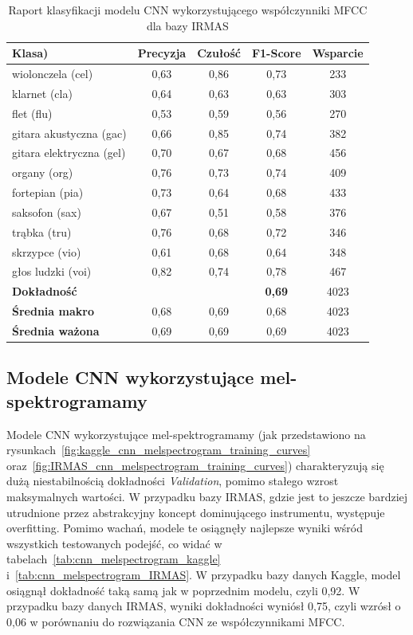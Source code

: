 \documentclass{SGGW-thesis}
\begin{document}
\begin{table}[H]
\centering
\caption{Raport klasyfikacji modelu CNN wykorzystującego współczynniki MFCC dla bazy IRMAS}
\label{tab:cnn_mfcc_IRMAS}
\begin{tabular}{lcccc}
\toprule
\textbf{Klasa)} & \textbf{Precyzja} & \textbf{Czułość} & \textbf{F1-Score} & \textbf{Wsparcie} \\
\midrule
wiolonczela (cel) & 0,63 & 0,86 & 0,73 & 233 \\
klarnet (cla) & 0,64 & 0,63 & 0,63 & 303 \\
flet (flu) & 0,53 & 0,59 & 0,56 & 270 \\
gitara akustyczna (gac) & 0,66 & 0,85 & 0,74 & 382 \\
gitara elektryczna (gel) & 0,70 & 0,67 & 0,68 & 456 \\
organy (org) & 0,76 & 0,73 & 0,74 & 409 \\
fortepian (pia) & 0,73 & 0,64 & 0,68 & 433 \\
saksofon (sax) & 0,67 & 0,51 & 0,58 & 376 \\
trąbka (tru) & 0,76 & 0,68 & 0,72 & 346 \\
skrzypce (vio) & 0,61 & 0,68 & 0,64 & 348 \\
głos ludzki (voi) & 0,82 & 0,74 & 0,78 & 467 \\
\midrule
\textbf{Dokładność} & & & \textbf{0,69} & 4023 \\
\textbf{Średnia makro} & 0,68 & 0,69 & 0,68 & 4023 \\
\textbf{Średnia ważona} & 0,69 & 0,69 & 0,69 & 4023 \\
\bottomrule
\end{tabular}
\end{table}

\subsection{Modele CNN wykorzystujące mel-spektrogramamy}
Modele CNN wykorzystujące mel-spektrogramamy (jak przedstawiono na rysunkach~\ref{fig:kaggle_cnn_melspectrogram_training_curves} oraz~\ref{fig:IRMAS_cnn_melspectrogram_training_curves}) charakteryzują się dużą niestabilnością dokładności \textit{Validation}, pomimo stałego wzrost maksymalnych wartości. W przypadku bazy IRMAS, gdzie jest to jeszcze bardziej utrudnione przez abstrakcyjny koncept dominującego instrumentu, występuje overfitting. Pomimo wachań, modele te osiągnęły najlepsze wyniki wśród wszystkich testowanych podejść, co widać w tabelach~\ref{tab:cnn_melspectrogram_kaggle} i~\ref{tab:cnn_melspectrogram_IRMAS}. W przypadku bazy danych Kaggle, model osiągnął dokładność taką samą jak w poprzednim modelu, czyli 0,92. W przypadku bazy danych IRMAS, wyniki dokładności wyniósł 0,75, czyli wzrósł o 0,06 w porównaniu do rozwiązania CNN ze współczynnikami MFCC.
\end{document}
